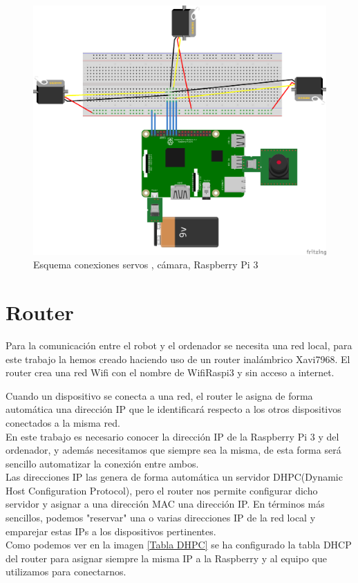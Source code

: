 \documentclass[twoside, 11pt]{epstfg}
\begin{document}
\begin{figure}[H]
	\centerline{
		\mbox{\includegraphics[width=.95\textwidth]{images/EsquemaServos.png}}
	}
	\caption{Esquema conexiones servos , cámara, Raspberry Pi 3}
\end{figure}\label{Figura conexiones robot}


\section{Router}
Para la comunicación entre el robot y el ordenador se necesita una red local,  para este trabajo la hemos creado haciendo uso de un router inalámbrico Xavi7968.
El router crea una red Wifi con el nombre de WifiRaspi3 y sin acceso a internet.

Cuando un dispositivo se conecta a una red, el router le asigna de forma automática una dirección IP que le identificará respecto a los otros dispositivos conectados a la misma red.\\
En este trabajo es necesario conocer la dirección IP de la Raspberry Pi 3 y del ordenador, y además necesitamos que siempre sea la misma, de esta forma será sencillo automatizar la conexión entre ambos.\\
Las direcciones IP las genera de forma automática un servidor DHPC(Dynamic Host Configuration Protocol), pero el router nos permite configurar dicho servidor y asignar a una dirección MAC una dirección IP. En términos más sencillos, podemos "reservar" una o varias direcciones IP de la red local y emparejar estas IPs a los dispositivos pertinentes.\\
Como podemos ver en la imagen \ref{Tabla DHPC} se ha configurado la tabla DHCP del router para asignar siempre la misma IP a la Raspberry y al equipo que utilizamos para conectarnos.
\end{document}

